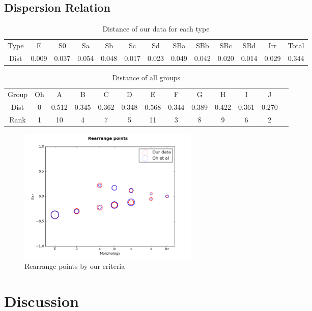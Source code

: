 \documentclass[a4paper,11pt]{article}
\begin{document}
\subsection{Dispersion Relation}
\label{subsec:disp}

\begin{table}[h]
\centering
\begin{tabular}{|c||c|c|c|c|c|c|c|c|c|c|c||c|}
\hline
Type & E & S0 & Sa & Sb & Sc & Sd & SBa & SBb & SBc & SBd & Irr & Total\\
\hhline{|=||=|=|=|=|=|=|=|=|=|=|=||=|}
Dist & 0.009 &0.037&0.054&0.048&0.017&0.023&0.049&0.042&0.020&0.014&0.029&0.344\\
\hline
\end{tabular}
\caption{\label{tab:ii} Distance of our data for each type}
\end{table}

\begin{table}[h!]
\centering
\begin{tabular}{|c||c|c|c|c|c|c|c|c|c|c|c|c|}
\hline
Group & Oh & A & B & C & D & E & F & G & H & I & J \\
\hhline{|=||=|=|=|=|=|=|=|=|=|=|=|}
Dist & 0 &
0.512&0.345&0.362&0.348&0.568&0.344&0.389&0.422&0.361&0.270\\
\hline
Rank &1&10&4&7&5&11&3&8&9&6&2\\
\hline
\end{tabular}
\caption{\label{tab:iii} Distance of all groups}
\end{table}

\begin{figure}[h!]
\centering
\includegraphics[height=65mm, width=100 mm]{Rearrange_final.png}
\caption{\label{fig:ii} Rearrange points by our criteria}
\end{figure}

\newpage


\section{Discussion}
\end{document}
